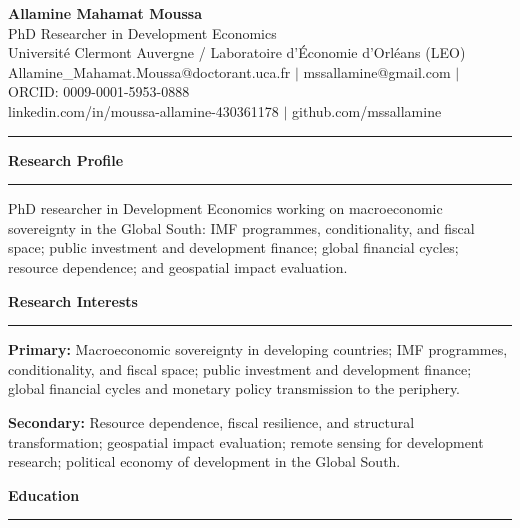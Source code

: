 \documentclass[10pt,a4paper]{article}
\newcommand{\cvsection}[1]{%
  \vspace{9pt}\noindent%
  {\normalsize\bfseries\color{navy}#1}%
  \par\nointerlineskip\vspace{2pt}%
  {\color{gold}\rule{\linewidth}{0.9pt}}%
  \par\vspace{3pt}%
}
\begin{document}
\begin{center}
  {\LARGE\bfseries\color{navy} Allamine Mahamat Moussa}\\[4pt]
  {\normalsize\color{mgray} PhD Researcher in Development Economics}\\[3pt]
  {\small
    Universit\'{e} Clermont Auvergne \textcolor{mgray}{/}
    Laboratoire d'\'Economie d'Orl\'eans (LEO)\\[3pt]
    \textcolor{mgray}{
      Allamine\_Mahamat.Moussa@doctorant.uca.fr \;$|$\;
      mssallamine@gmail.com \;$|$\; ORCID: 0009-0001-5953-0888
    }\\[1pt]
    \textcolor{mgray}{
      linkedin.com/in/moussa-allamine-430361178 \;$|$\;
      github.com/mssallamine
    }
  }
\end{center}
\vspace{3pt}
{\color{gold}\rule{\linewidth}{1.2pt}}
\vspace{2pt}

\cvsection{Research Profile}
PhD researcher in Development Economics working on macroeconomic sovereignty in the
Global South: IMF programmes, conditionality, and fiscal space; public investment and
development finance; global financial cycles; resource dependence; and geospatial
impact evaluation.

\cvsection{Research Interests}

\textbf{Primary:}
Macroeconomic sovereignty in developing countries; IMF programmes, conditionality,
and fiscal space; public investment and development finance; global financial cycles
and monetary policy transmission to the periphery.

\textbf{Secondary:}
Resource dependence, fiscal resilience, and structural transformation;
geospatial impact evaluation; remote sensing for development research;
political economy of development in the Global South.

\cvsection{Education}
\end{document}
